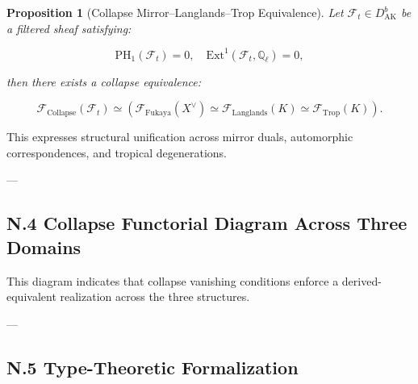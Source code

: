 \documentclass[11pt]{article}
\newtheorem{proposition}[theorem]{Proposition}
\begin{document}
\begin{proposition}[Collapse Mirror–Langlands–Trop Equivalence]
Let $\mathcal{F}_t \in D^b_{\mathrm{AK}}$ be a filtered sheaf satisfying:

\[
\mathrm{PH}_1(\mathcal{F}_t) = 0, \quad \mathrm{Ext}^1(\mathcal{F}_t, \mathbb{Q}_\ell) = 0,
\]

then there exists a collapse equivalence:

\[
\mathcal{F}_{\mathrm{Collapse}}(\mathcal{F}_t) \simeq
\left(
\mathcal{F}_{\mathrm{Fukaya}}(X^\vee)
\simeq
\mathcal{F}_{\mathrm{Langlands}}(K)
\simeq
\mathcal{F}_{\mathrm{Trop}}(K)
\right).
\]
\end{proposition}

This expresses structural unification across mirror duals, automorphic correspondences, and tropical degenerations.

---

\subsection*{N.4 Collapse Functorial Diagram Across Three Domains}


This diagram indicates that collapse vanishing conditions enforce a derived-equivalent realization across the three structures.

---

\subsection*{N.5 Type-Theoretic Formalization}
\end{document}
